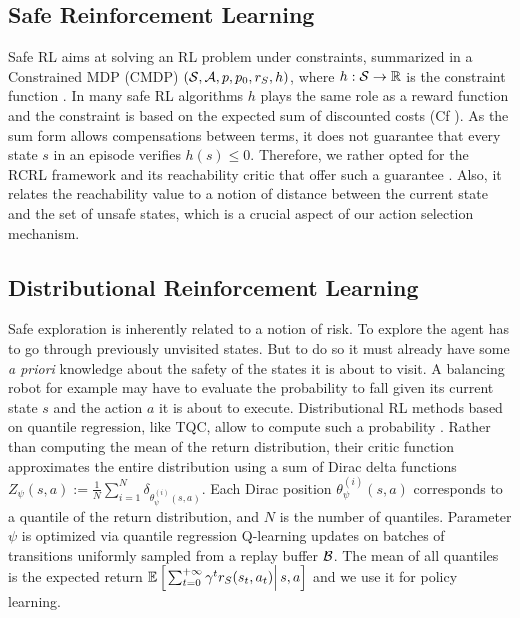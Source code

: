 \subsection{Safe Reinforcement Learning}
\label{subsection:SafeRL}

Safe RL aims at solving an RL problem under constraints, summarized in a Constrained MDP (CMDP) 
$(\mathcal{S}, \mathcal{A}, p, p_0, r_S, h)$, where $h: \mathcal{S} \to \mathbb{R}$ is 
the constraint function \cite{AltmanCMDP}. In many safe RL algorithms $h$ plays the 
same role as a reward function and the constraint is based on the expected sum of discounted costs (Cf ). 
As the sum form allows compensations between terms, it does not guarantee that every state $s$ in an episode verifies $h(s) \le 0$.
Therefore, we rather opted for the RCRL framework and its reachability critic that offer such a guarantee \cite{RCRL2022}. Also, it relates the reachability value to a notion of distance between the current state and the set of unsafe states, which is a crucial aspect of our action selection mechanism. 

\subsection{Distributional Reinforcement Learning}

Safe exploration is inherently related to a notion of risk. To explore the agent has to go through previously unvisited states.
But to do so it must already have some \textit{a priori} knowledge about the safety of the states it is about to visit.
A balancing robot for example may have to evaluate the probability to fall given its current state $s$ and the action $a$ it is
about to execute. 
Distributional RL methods based on quantile regression, like TQC, allow to compute such a probability \cite{QR-DQN,TQC}. Rather than computing the mean of the return distribution, their critic function approximates the entire distribution using a sum of Dirac delta functions $Z_{\psi}(s, a) := \frac{1}{N}\sum_{i=1}^{N} \delta_{\theta_{\psi}^{(i)}(s, a)}$. Each Dirac position $\theta_{\psi}^{(i)}(s, a)$ corresponds to a quantile of the return distribution, and $N$ is the number of quantiles. Parameter $\psi$ is optimized via quantile regression Q-learning \cite{QR-DQN} updates on batches of transitions uniformly sampled from a replay buffer $\mathcal{B}$. The mean of all quantiles is the expected return $\mathbb{E} \left[ \left. \sum_{t=0}^{+\infty} \gamma^t r_S(s_t, a_t) \right| s, a \right]$ and we use it for policy learning. 

